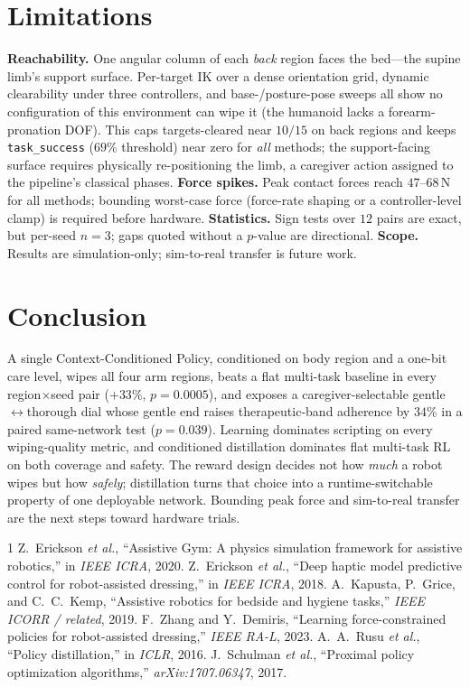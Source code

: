 \documentclass[conference]{IEEEtran}
\begin{document}
\section{Limitations}
\label{sec:limits}
\textbf{Reachability.} One angular column of each \emph{back} region faces the bed---the
supine limb's support surface. Per-target IK over a dense orientation grid, dynamic
clearability under three controllers, and base-/posture-pose sweeps all show no configuration
of this environment can wipe it (the humanoid lacks a forearm-pronation DOF). This caps
targets-cleared near $10/15$ on back regions and keeps \texttt{task\_success} ($69\%$
threshold) near zero for \emph{all} methods; the support-facing surface requires physically
re-positioning the limb, a caregiver action assigned to the pipeline's classical phases.
\textbf{Force spikes.} Peak contact forces reach $47$--$68$\,N for all methods; bounding
worst-case force (force-rate shaping or a controller-level clamp) is required before hardware.
\textbf{Statistics.} Sign tests over $12$ pairs are exact, but per-seed $n{=}3$; gaps quoted
without a $p$-value are directional. \textbf{Scope.} Results are simulation-only; sim-to-real
transfer is future work.

\section{Conclusion}
A single Context-Conditioned Policy, conditioned on body region and a one-bit care level, wipes
all four arm regions, beats a flat multi-task baseline in every region$\times$seed pair
($+33\%$, $p{=}0.0005$), and exposes a caregiver-selectable gentle$\leftrightarrow$thorough
dial whose gentle end raises therapeutic-band adherence by $34\%$ in a paired same-network test
($p{=}0.039$). Learning dominates scripting on every wiping-quality metric, and conditioned
distillation dominates flat multi-task RL on both coverage and safety. The reward design
decides not how \emph{much} a robot wipes but how \emph{safely}; distillation turns that choice
into a runtime-switchable property of one deployable network. Bounding peak force and
sim-to-real transfer are the next steps toward hardware trials.

\begin{thebibliography}{1}
\footnotesize
{} Z.~Erickson \emph{et al.}, ``Assistive Gym: A physics
simulation framework for assistive robotics,'' in \emph{IEEE ICRA}, 2020.
 Z.~Erickson \emph{et al.}, ``Deep haptic model predictive
control for robot-assisted dressing,'' in \emph{IEEE ICRA}, 2018.
 A.~Kapusta, P.~Grice, and C.~C.~Kemp, ``Assistive robotics for
bedside and hygiene tasks,'' \emph{IEEE ICORR / related}, 2019.
 F.~Zhang and Y.~Demiris, ``Learning force-constrained
policies for robot-assisted dressing,'' \emph{IEEE RA-L}, 2023.
 A.~A.~Rusu \emph{et al.}, ``Policy distillation,'' in
\emph{ICLR}, 2016.
 J.~Schulman \emph{et al.}, ``Proximal policy optimization
algorithms,'' \emph{arXiv:1707.06347}, 2017.
\end{thebibliography}
\end{document}
